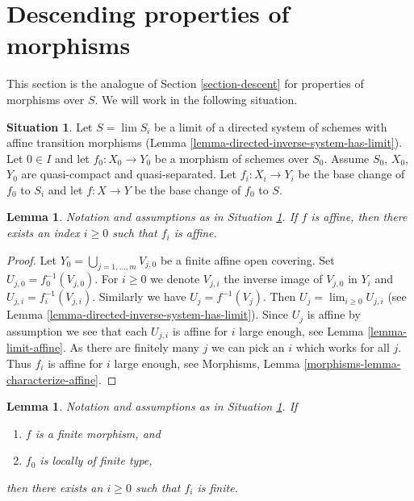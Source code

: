 \documentclass{stacks-project}
\theoremstyle{plain}
\newtheorem{lemma}[subsection]{Lemma}
\theoremstyle{definition}
\newtheorem{situation}[subsection]{Situation}
\theoremstyle{remark}
\numberwithin{equation}{subsection}
\def\lim{\mathop{\mathrm{lim}}\nolimits}
\begin{document}
\section{Descending properties of morphisms}
\label{section-descent-of-properties}

\noindent
This section is the analogue of
Section \ref{section-descent}
for properties of morphisms over $S$.
We will work in the following situation.

\begin{situation}
\label{situation-descent-property}
Let $S = \lim S_i$ be a limit of a directed system of schemes
with affine transition morphisms
(Lemma \ref{lemma-directed-inverse-system-has-limit}).
Let $0 \in I$ and let $f_0 : X_0 \to Y_0$ be a morphism of schemes over $S_0$.
Assume $S_0$, $X_0$, $Y_0$ are quasi-compact and quasi-separated.
Let $f_i : X_i \to Y_i$ be the base change of $f_0$ to $S_i$ and
let $f : X \to Y$ be the base change of $f_0$ to $S$.
\end{situation}

\begin{lemma}
\label{lemma-descend-affine-finite-presentation}
Notation and assumptions as in Situation \ref{situation-descent-property}.
If $f$ is affine, then there exists an index $i \geq 0$
such that $f_i$ is affine.
\end{lemma}

\begin{proof}
Let $Y_0 = \bigcup_{j = 1, \ldots, m} V_{j, 0}$ be a finite affine
open covering. Set $U_{j, 0} = f_0^{-1}(V_{j, 0})$. For $i \geq 0$
we denote $V_{j, i}$ the inverse image of $V_{j, 0}$ in $Y_i$ and
$U_{j, i} = f_i^{-1}(V_{j, i})$. Similarly we have
$U_j = f^{-1}(V_j)$. Then $U_j = \lim_{i \geq 0} U_{j, i}$
(see Lemma \ref{lemma-directed-inverse-system-has-limit}).
Since $U_j$ is affine by assumption we see that
each $U_{j, i}$ is affine for $i$ large enough, see
Lemma \ref{lemma-limit-affine}. As there are finitely many $j$ we
can pick an $i$ which works for all $j$. Thus $f_i$ is
affine for $i$ large enough, see
Morphisms, Lemma \ref{morphisms-lemma-characterize-affine}.
\end{proof}

\begin{lemma}
\label{lemma-descend-finite-finite-presentation}
Notation and assumptions as in Situation \ref{situation-descent-property}.
If
\begin{enumerate}
\item $f$ is a finite morphism, and
\item $f_0$ is locally of finite type,
\end{enumerate}
then there exists an $i \geq 0$ such that $f_i$ is finite.
\end{lemma}
\end{document}
